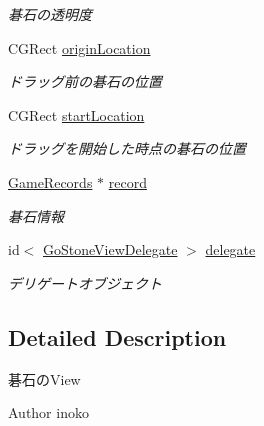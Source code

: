 \begin{DoxyCompactItemize}
\begin{DoxyCompactList}\small\item\em 碁石の透明度 \end{DoxyCompactList}\item 
\hypertarget{interface_go_stone_view_a23d6e4c7a98ae4c237bd9ac77bca3309}{
CGRect \hyperlink{interface_go_stone_view_a23d6e4c7a98ae4c237bd9ac77bca3309}{originLocation}}
\label{interface_go_stone_view_a23d6e4c7a98ae4c237bd9ac77bca3309}

\begin{DoxyCompactList}\small\item\em ドラッグ前の碁石の位置 \end{DoxyCompactList}\item 
\hypertarget{interface_go_stone_view_a41864df5ae2adaaabcaa2de73bc64668}{
CGRect \hyperlink{interface_go_stone_view_a41864df5ae2adaaabcaa2de73bc64668}{startLocation}}
\label{interface_go_stone_view_a41864df5ae2adaaabcaa2de73bc64668}

\begin{DoxyCompactList}\small\item\em ドラッグを開始した時点の碁石の位置 \end{DoxyCompactList}\item 
\hypertarget{interface_go_stone_view_ad65ef4df5f6ec38bc32d586e91f3dcbb}{
\hyperlink{interface_game_records}{GameRecords} $\ast$ \hyperlink{interface_go_stone_view_ad65ef4df5f6ec38bc32d586e91f3dcbb}{record}}
\label{interface_go_stone_view_ad65ef4df5f6ec38bc32d586e91f3dcbb}

\begin{DoxyCompactList}\small\item\em 碁石情報 \end{DoxyCompactList}\item 
\hypertarget{interface_go_stone_view_a064bebe6eeda2625794e3d4072d2f13f}{
id$<$ \hyperlink{protocol_go_stone_view_delegate-p}{GoStoneViewDelegate} $>$ \hyperlink{interface_go_stone_view_a064bebe6eeda2625794e3d4072d2f13f}{delegate}}
\label{interface_go_stone_view_a064bebe6eeda2625794e3d4072d2f13f}

\begin{DoxyCompactList}\small\item\em デリゲートオブジェクト \end{DoxyCompactList}\end{DoxyCompactItemize}


\subsection{Detailed Description}
碁石のView \begin{DoxyAuthor}{Author}
inoko 
\end{DoxyAuthor}


